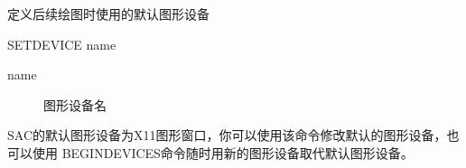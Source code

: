 \label{cmd:setdevice}

定义后续绘图时使用的默认图形设备

\begin{SACSTX}
SETDEVICE name
\end{SACSTX}

\begin{description}
\item [name] 图形设备名
\end{description}

SAC的默认图形设备为X11图形窗口，你可以使用该命令修改默认的图形设备，也可以使用
BEGINDEVICES命令随时用新的图形设备取代默认图形设备。

